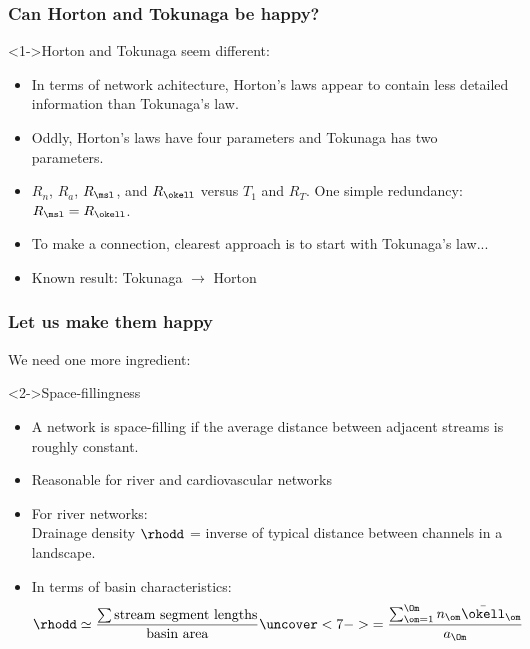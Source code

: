 \begin{frame}[label=]
  \frametitle{Can Horton and Tokunaga be happy?}

  \begin{block}<1->{Horton and Tokunaga seem different:}
    \begin{itemize}
      \item<2-> In terms of network achitecture, 
        Horton's laws appear to contain less
        detailed information than Tokunaga's law.
      \item<3-> Oddly, Horton's laws have \alert{four} parameters
        and Tokunaga has \alert{two} parameters.
      \item<4-> $R_n$, $R_a$, $R_\msl$, and $R_\okell$ \alert{versus} $T_1$ and $R_T$.
        One simple redundancy: $R_\msl = R_\okell$.\\
      \item<5-> To make a connection, clearest approach
        is to start with Tokunaga's law...
      \item<6-> Known result: Tokunaga $\rightarrow$ Horton\cite{tokunaga1966a,tokunaga1978a,tokunaga1984a,peckham1995a,dodds1999a}
    \end{itemize}
  \end{block}

\end{frame}

\begin{frame}[label=]
  \frametitle{Let us make them happy}

  \alert{We need one more ingredient:}

  \begin{block}<2->{Space-fillingness}
    \begin{itemize}
    \item<3-> A network is \alert{space-filling}
      if the average distance between adjacent streams
      is roughly constant.
    \item<4-> Reasonable for river and cardiovascular networks
    \item<5-> For river networks:\\
      \alert{Drainage density $\rhodd$} = inverse of typical distance between
      channels in a landscape.
    \item<6-> In terms of basin characteristics:
      $$
      \rhodd \simeq \frac{\sum \mbox{stream segment lengths}}{\mbox{basin area}}
      \uncover<7->{= \frac{\sum_{\om=1}^{\Om} n_\om \bar{\okell}_\om} { a_\Om}}
      $$
    \end{itemize}
  \end{block}

\end{frame}

